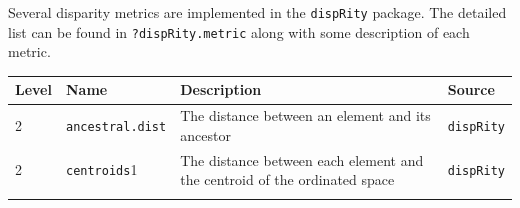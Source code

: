 \documentclass[]{book}
\theoremstyle{definition}
\theoremstyle{definition}
\theoremstyle{definition}
\theoremstyle{remark}
\begin{document}
Several disparity metrics are implemented in the \texttt{dispRity}
package. The detailed list can be found in \texttt{?dispRity.metric}
along with some description of each metric.

\begin{longtable}[]{@{}llll@{}}
\toprule
\begin{minipage}[b]{0.08\columnwidth}\raggedright\strut
Level\strut
\end{minipage} & \begin{minipage}[b]{0.08\columnwidth}\raggedright\strut
Name\strut
\end{minipage} & \begin{minipage}[b]{0.61\columnwidth}\raggedright\strut
Description\strut
\end{minipage} & \begin{minipage}[b]{0.11\columnwidth}\raggedright\strut
Source\strut
\end{minipage}\tabularnewline
\midrule
\endhead
\begin{minipage}[t]{0.08\columnwidth}\raggedright\strut
2\strut
\end{minipage} & \begin{minipage}[t]{0.08\columnwidth}\raggedright\strut
\texttt{ancestral.dist}\strut
\end{minipage} & \begin{minipage}[t]{0.61\columnwidth}\raggedright\strut
The distance between an element and its ancestor\strut
\end{minipage} & \begin{minipage}[t]{0.11\columnwidth}\raggedright\strut
\texttt{dispRity}\strut
\end{minipage}\tabularnewline
\begin{minipage}[t]{0.08\columnwidth}\raggedright\strut
2\strut
\end{minipage} & \begin{minipage}[t]{0.08\columnwidth}\raggedright\strut
\texttt{centroids}1\strut
\end{minipage} & \begin{minipage}[t]{0.61\columnwidth}\raggedright\strut
The distance between each element and the centroid of the ordinated
space\strut
\end{minipage} & \begin{minipage}[t]{0.11\columnwidth}\raggedright\strut
\texttt{dispRity}\strut
\end{minipage}\tabularnewline
\begin{minipage}[t]{0.08\columnwidth}\raggedright\strut

\end{minipage}
\end{longtable}
\end{document}
